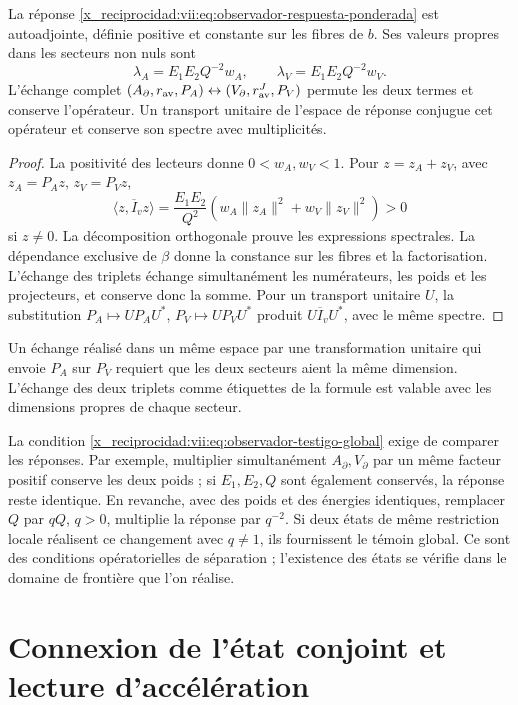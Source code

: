 \begin{proposition}
\label{x_reciprocidad:vii:prop:observador-respuesta-positiva}
La réponse \eqref{x_reciprocidad:vii:eq:observador-respuesta-ponderada} est
autoadjointe, définie positive et constante sur les fibres de \(b\).
Ses valeurs propres dans les secteurs non nuls sont
\[
 \lambda_A=E_1E_2Q^{-2}w_A,\qquad
 \lambda_V=E_1E_2Q^{-2}w_V.
\]
L'échange complet \((A_\partial,r_{\rm av},P_A)
 \leftrightarrow(V_\partial,r_{\rm av}^{J},P_V)\) permute les deux termes et conserve l'opérateur. Un transport unitaire de l'espace de réponse conjugue cet opérateur et conserve son spectre avec multiplicités.
\end{proposition}

\begin{proof}
La positivité des lecteurs donne \(0<w_A,w_V<1\). Pour
\(z=z_A+z_V\), avec \(z_A=P_Az\), \(z_V=P_Vz\),
\[
 \langle z,\overline I_vz\rangle
 =\frac{E_1E_2}{Q^2}
   (w_A\|z_A\|^2+w_V\|z_V\|^2)>0
\]
si \(z\neq0\). La décomposition orthogonale prouve les expressions
spectrales. La dépendance exclusive de \(\beta\) donne la constance
sur les fibres et la factorisation. L'échange des triplets
échange simultanément les numérateurs, les poids et les projecteurs, et
conserve donc la somme. Pour un transport unitaire \(U\), la substitution
\(P_A\mapsto UP_AU^*\), \(P_V\mapsto UP_VU^*\) produit
\(U\overline I_vU^*\), avec le même spectre.
\end{proof}

Un échange réalisé dans un même espace par une transformation unitaire
qui envoie \(P_A\) sur \(P_V\) requiert que les deux secteurs aient
la même dimension. L'échange des deux triplets comme étiquettes de la
formule est valable avec les dimensions propres de chaque secteur.

La condition \eqref{x_reciprocidad:vii:eq:observador-testigo-global} exige de comparer les réponses. Par exemple, multiplier simultanément \(A_\partial,V_\partial\) par un même facteur positif conserve les deux poids ; si \(E_1,E_2,Q\) sont également conservés, la réponse reste identique. En revanche, avec des poids et des énergies identiques, remplacer \(Q\) par \(qQ\), \(q>0\), multiplie la réponse par \(q^{-2}\). Si deux états de même restriction locale réalisent ce changement avec \(q\neq1\), ils fournissent le témoin global. Ce sont des conditions opératorielles de séparation ; l'existence des états se vérifie dans le domaine de frontière que l'on réalise.

\section{Connexion de l'état conjoint et lecture d'accélération}
\label{x_reciprocidad:vii:sec:observador-autoinercia}

